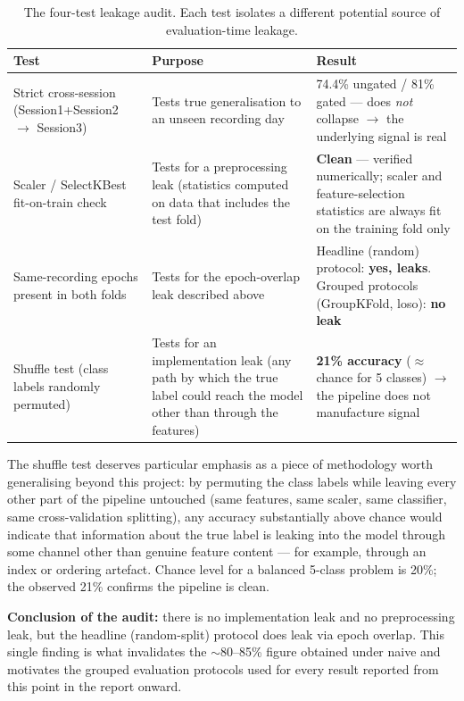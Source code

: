 \begin{table}[htbp]
\centering
\caption{The four-test leakage audit. Each test isolates a
different potential source of evaluation-time leakage.}
\label{tab:leakage_audit}
\renewcommand{\arraystretch}{1.4}
\begin{tabular}{p{3.4cm} p{3.6cm} p{5.0cm}}
\toprule
\textbf{Test} & \textbf{Purpose} & \textbf{Result} \\
\midrule
Strict cross-session (Session1+Session2 $\rightarrow$ Session3)
    & Tests true generalisation to an unseen recording day
    & 74.4\% ungated / 81\% gated --- does \emph{not} collapse
      $\rightarrow$ the underlying signal is real \\
Scaler / SelectKBest fit-on-train check
    & Tests for a preprocessing leak (statistics computed on
      data that includes the test fold)
    & \textbf{Clean} --- verified numerically; scaler and
      feature-selection statistics are always fit on the
      training fold only \\
Same-recording epochs present in both folds
    & Tests for the epoch-overlap leak described above
    & Headline (random) protocol: \textbf{yes, leaks}.
      Grouped protocols (GroupKFold, \acrshort{loso}):
      \textbf{no leak} \\
Shuffle test (class labels randomly permuted)
    & Tests for an implementation leak (any path by which the
      true label could reach the model other than through the
      features)
    & \textbf{21\% accuracy} ($\approx$ chance for 5 classes)
      $\rightarrow$ the pipeline does not manufacture signal \\
\bottomrule
\end{tabular}
\end{table}

The shuffle test deserves particular emphasis as a piece of
methodology worth generalising beyond this project: by permuting
the class labels while leaving every other part of the pipeline
untouched (same features, same scaler, same classifier, same
cross-validation splitting), any accuracy substantially above chance
would indicate that information about the true label is leaking
into the model through some channel other than genuine feature
content --- for example, through an index or ordering artefact.
Chance level for a balanced 5-class problem is 20\%; the observed
21\% confirms the pipeline is clean.

\textbf{Conclusion of the audit:} there is no implementation leak
and no preprocessing leak, but the headline (random-split) protocol
does leak via epoch overlap. This single finding is what
invalidates the $\sim$80--85\% figure obtained under naive
 and motivates the grouped evaluation
protocols used for every result reported from this point in the
report onward.


